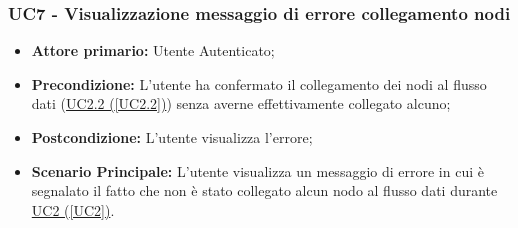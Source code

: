 \subsubsection{UC7 - Visualizzazione messaggio di errore collegamento nodi}\label{UC7}
\begin{itemize}
\item \textbf{Attore primario:} Utente Autenticato;
\item \textbf{Precondizione:} L'utente ha confermato il collegamento dei nodi al flusso dati (\hyperref[UC2.2]{UC2.2 (\ref*{UC2.2})}) senza averne effettivamente collegato alcuno;
\item \textbf{Postcondizione:} L'utente visualizza l'errore;
\item \textbf{Scenario Principale:} L'utente visualizza un messaggio di errore in cui è segnalato il fatto che non è stato collegato alcun nodo al flusso dati durante \hyperref[UC2]{UC2 (\ref*{UC2})}.
\end{itemize}
